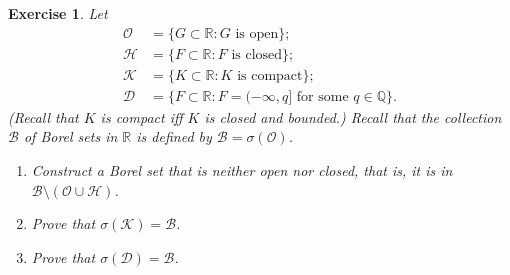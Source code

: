 \documentclass{article}
\newtheorem{exercise}[theorem]{Exercise}
\begin{document}
\begin{exercise}
    Let
    \[
    \begin{aligned}
        \mathcal{O} &= \{G \subset \mathbb{R} : G \text{ is open}\}; \\
        \mathcal{H} &= \{F \subset \mathbb{R} : F \text{ is closed}\}; \\
        \mathcal{K} &= \{K \subset \mathbb{R} : K \text{ is compact}\}; \\
        \mathcal{D} &= \{F \subset \mathbb{R} : F = (-\infty, q] \text{ for some } q \in \mathbb{Q}\}.
    \end{aligned}
    \]
    (Recall that $K$ is compact iff $K$ is closed and bounded.) Recall that the collection $\mathcal{B}$ of Borel sets in $\mathbb{R}$ is defined by $\mathcal{B} = \sigma(\mathcal{O})$.
    \begin{enumerate}
        \item Construct a Borel set that is neither open nor closed, that is, it is in $\mathcal{B} \setminus (\mathcal{O} \cup \mathcal{H})$.
        \item Prove that $\sigma(\mathcal{K}) = \mathcal{B}$.
        \item Prove that $\sigma(\mathcal{D}) = \mathcal{B}$.
    \end{enumerate}
\end{exercise}
\end{document}
